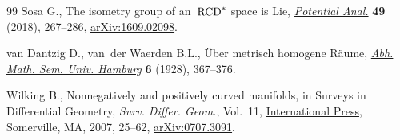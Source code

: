 \documentclass[10pt,a4paper]{amsart}
\numberwithin{equation}{section}
\theoremstyle{definition}
\begin{document}
\begin{thebibliography}{99}
Sosa G., The isometry group of an~{${\rm RCD}^*$} space is {L}ie,
 \href{https://doi.org/10.1007/s11118-017-9656-4}{\textit{Potential Anal.}}
 \textbf{49} (2018), 267--286,
 \href{http://arxiv.org/abs/1609.02098}{arXiv:1609.02098}.

van Dantzig D., van~der Waerden B.L., \"Uber metrisch homogene {R}\"aume,
 \href{https://doi.org/10.1007/BF02940622}{\textit{Abh. Math. Sem. Univ.
 Hamburg}} \textbf{6} (1928), 367--376.

Wilking B., Nonnegatively and positively curved manifolds, in Surveys in
 {D}ifferential {G}eometry, \textit{Surv. Differ. Geom.}, Vol.~11,
 \href{https://doi.org/10.4310/SDG.2006.v11.n1.a3}{International Press},
 Somerville, MA, 2007, 25--62,
 \href{http://arxiv.org/abs/0707.3091}{arXiv:0707.3091}.

\end{thebibliography}
\end{document}
